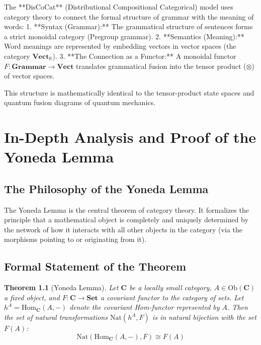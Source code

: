 \documentclass[11pt,a4paper,oneside]{book}
\theoremstyle{definition}
\theoremstyle{plain}
\newtheorem{theorem}[definition]{Theorem}
\newcommand{\R}{\mathbb{R}}
\newcommand{\Cat}[1]{\mathbf{#1}}
\newcommand{\Hom}{\text{Hom}}
\newcommand{\Nat}{\text{Nat}}
\begin{document}
The **DisCoCat** (Distributional Compositional Categorical) model uses category theory to connect the formal structure of grammar with the meaning of words:
1. **Syntax (Grammar):** The grammatical structure of sentences forms a strict monoidal category (Pregroup grammar).
2. **Semantics (Meaning):** Word meanings are represented by embedding vectors in vector spaces (the category $\Cat{Vect}_{\R}$).
3. **The Connection as a Functor:** A monoidal functor $F: \Cat{Grammar} \to \Cat{Vect}$ translates grammatical fusion into the tensor product ($\otimes$) of vector spaces.

This structure is mathematically identical to the tensor-product state spaces and quantum fusion diagrams of quantum mechanics.


\chapter{In-Depth Analysis and Proof of the Yoneda Lemma}

\section{The Philosophy of the Yoneda Lemma}
The Yoneda Lemma is the central theorem of category theory. It formalizes the principle that a mathematical object is completely and uniquely determined by the network of how it interacts with all other objects in the category (via the morphisms pointing to or originating from it).

\section{Formal Statement of the Theorem}

\begin{theorem}[Yoneda Lemma]
Let $\Cat{C}$ be a locally small category, $A \in \text{Ob}(\Cat{C})$ a fixed object, and $F: \Cat{C} \to \Cat{Set}$ a covariant functor to the category of sets. Let $h^A = \Hom_{\Cat{C}}(A, -)$ denote the covariant Hom-functor represented by $A$. Then the set of natural transformations $\Nat(h^A, F)$ is in natural bijection with the set $F(A)$:
\begin{equation}
\Nat(\Hom_{\Cat{C}}(A, -), F) \cong F(A)
\end{equation}
\end{theorem}
\end{document}
